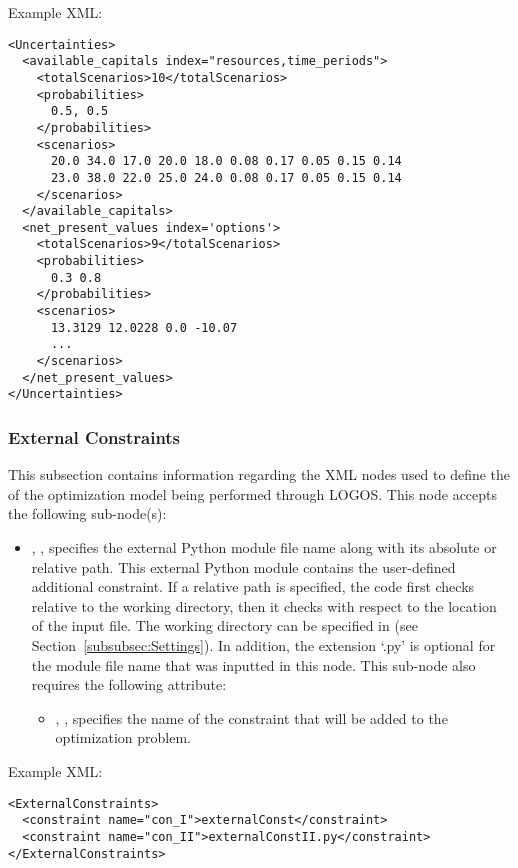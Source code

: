 Example XML:
\begin{lstlisting}[style=XML]
<Uncertainties>
  <available_capitals index="resources,time_periods">
    <totalScenarios>10</totalScenarios>
    <probabilities>
      0.5, 0.5
    </probabilities>
    <scenarios>
      20.0 34.0 17.0 20.0 18.0 0.08 0.17 0.05 0.15 0.14
      23.0 38.0 22.0 25.0 24.0 0.08 0.17 0.05 0.15 0.14
    </scenarios>
  </available_capitals>
  <net_present_values index='options'>
    <totalScenarios>9</totalScenarios>
    <probabilities>
      0.3 0.8
    </probabilities>
    <scenarios>
      13.3129 12.0228 0.0 -10.07
      ...
    </scenarios>
  </net_present_values>
</Uncertainties>
\end{lstlisting}

%
\subsubsection{External Constraints}
\label{subsubsec:ExternalConstraints}

This subsection contains information regarding the XML nodes used to define the
 of the optimization model being performed through LOGOS.
This node accepts the following sub-node(s):
\begin{itemize}
  \item {}, , specifies the external Python
  module file name along with its absolute or relative path. This external Python
  module contains the user-defined additional constraint.
  \nb If a relative path is specified, the code first checks relative to the working directory,
  then it checks with respect to the location of the input file. The working directory can be
  specified in  (see Section~\ref{subsubsec:Settings}). In addition, the extension
  `.py' is optional for the module file name that was inputted in this node.
  This sub-node also requires the following attribute:
  \begin{itemize}
    \item {}, , specifies the name of the constraint that will
    be added to the optimization problem.
  \end{itemize}
\end{itemize}

Example XML:
\begin{lstlisting}[style=XML]
<ExternalConstraints>
  <constraint name="con_I">externalConst</constraint>
  <constraint name="con_II">externalConstII.py</constraint>
</ExternalConstraints>
\end{lstlisting}

